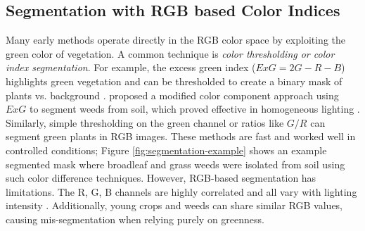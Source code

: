 \documentclass[letterpaper]{report}
\begin{document}
\subsection{Segmentation with RGB based Color Indices}  
Many early methods operate directly in the RGB color space by exploiting the green color of vegetation. A common technique is \textit{color thresholding or color index segmentation}. For example, the excess green index ($ExG = 2G - R - B$) highlights green vegetation and can be thresholded to create a binary mask of plants vs. background \parencite{Wu2021-gt}. \citeauthor{Tang2000-an} proposed a modified color component approach using $ExG$ to segment weeds from soil, which proved effective in homogeneous lighting \parencite{Tang2000-an}. Similarly, simple thresholding on the green channel or ratios like $G/R$ can segment green plants in RGB images. These methods are fast and worked well in controlled conditions; Figure \ref{fig:segmentation-example} shows an example segmented mask where broadleaf and grass weeds were isolated from soil using such color difference techniques. However, RGB-based segmentation has limitations. The R, G, B channels are highly correlated and all vary with lighting intensity \parencite{Wu2021-gt}. Additionally, young crops and weeds can share similar RGB values, causing mis-segmentation when relying purely on greenness.
\end{document}
